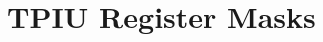 \hypertarget{group___t_p_i_u___register___masks}{}\section{T\+P\+IU Register Masks}
\label{group___t_p_i_u___register___masks}
